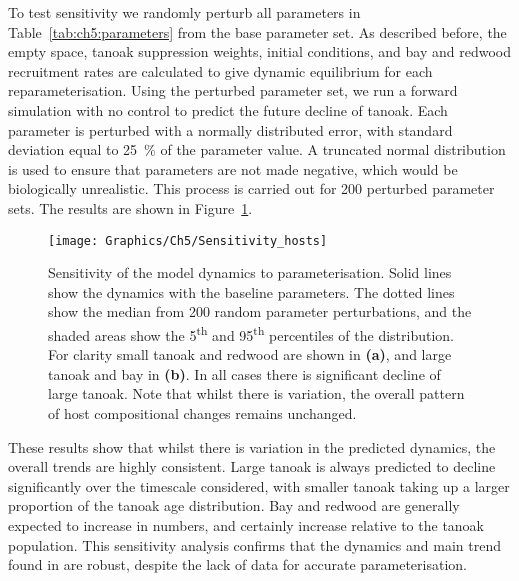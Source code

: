 To test sensitivity we randomly perturb all parameters in Table~\ref{tab:ch5:parameters} from the base parameter set. As described before, the empty space, tanoak suppression weights, initial conditions, and bay and redwood recruitment rates are calculated to give dynamic equilibrium for each reparameterisation. Using the perturbed parameter set, we run a forward simulation with no control to predict the future decline of tanoak. Each parameter is perturbed with a normally distributed error, with standard deviation equal to \SI{25}{\percent} of the parameter value. A truncated normal distribution is used to ensure that parameters are not made negative, which would be biologically unrealistic. This process is carried out for 200 perturbed parameter sets. The results are shown in Figure~\ref{fig:ch5:model_sensitivity}.

\vspace*{\floatsep}
\begin{figure}[H]
    \begin{center}
        \texttt{[image: Graphics/Ch5/Sensitivity\_hosts]}
        \caption[Sensitivity of model dynamics]{Sensitivity of the model dynamics to parameterisation. Solid lines show the dynamics with the baseline parameters. The dotted lines show the median from 200 random parameter perturbations, and the shaded areas show the 5\textsuperscript{th} and 95\textsuperscript{th} percentiles of the distribution. For clarity small tanoak and redwood are shown in \textbf{(a)}, and large tanoak and bay in \textbf{(b)}. In all cases there is significant decline of large tanoak. Note that whilst there is variation, the overall pattern of host compositional changes remains unchanged.\label{fig:ch5:model_sensitivity}}
    \end{center}
\end{figure}

These results show that whilst there is variation in the predicted dynamics, the overall trends are highly consistent. Large tanoak is always predicted to decline significantly over the timescale considered, with smaller tanoak taking up a larger proportion of the tanoak age distribution. Bay and redwood are generally expected to increase in numbers, and certainly increase relative to the tanoak population. This sensitivity analysis confirms that the dynamics and main trend found in \citet{cobb_ecosystem_2012} are robust, despite the lack of data for accurate parameterisation.

\FloatBarrier

